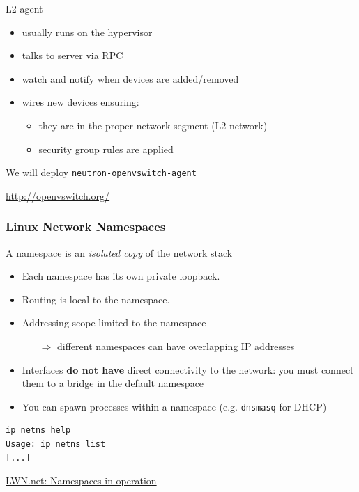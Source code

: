 \documentclass[english,serif,mathserif,xcolor=pdftex,dvipsnames,table]{beamer}
\begin{document}
\begin{frame}
  {L2 agent}
  \begin{itemize}
  \item usually runs on the hypervisor
  \item talks to server via RPC
  \item watch and notify when devices are added/removed
  \item wires new devices ensuring:
    \begin{itemize}
    \item they are in the proper network segment (L2 network)
    \item security group rules are applied
    \end{itemize}
  \end{itemize}

  \+
  We will deploy \texttt{neutron-openvswitch-agent}

  \+
  {\footnotesize\url{http://openvswitch.org/}}
\end{frame}



\begin{frame}[fragile]
  \frametitle{Linux Network Namespaces}
A namespace is an \textit{isolated copy} of the network stack

\begin{itemize}
\item Each namespace has its own private loopback.
\item Routing is local to the namespace.
\item Addressing scope limited to the namespace
  \begin{itemize}
  \item[$\Rightarrow$] different namespaces can have overlapping IP addresses
  \end{itemize}
\item Interfaces \textbf{do not have} direct connectivity to the
  network: you must connect them to a bridge in the default namespace
\item You can spawn processes within a namespace
  (e.g. \texttt{dnsmasq} for DHCP)
\end{itemize}

\footnotesize
\begin{verbatim}
ip netns help
Usage: ip netns list
[...]
\end{verbatim}
{\footnotesize\href{http://lwn.net/Articles/531114/}{LWN.net: Namespaces
    in operation}}
\end{frame}
\end{document}
